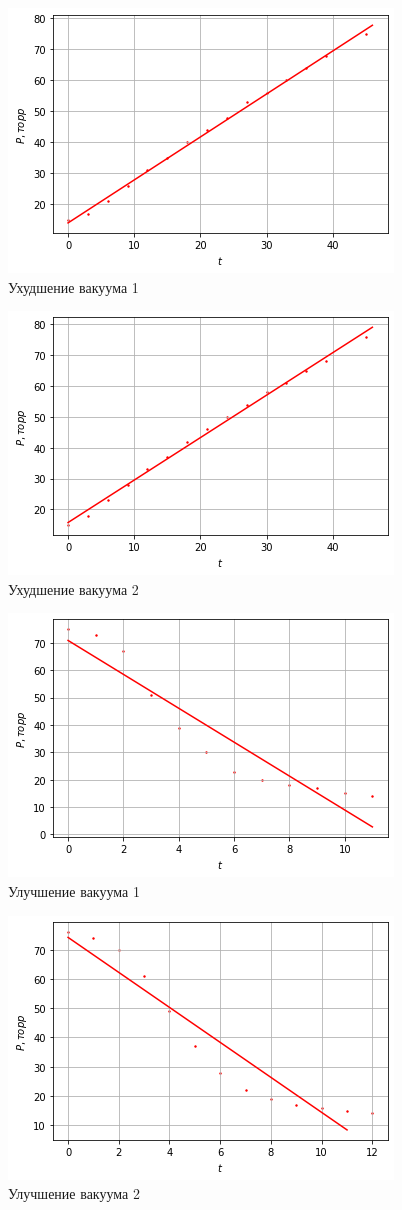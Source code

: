 \documentclass[a4paper,12pt]{article}
\begin{document}
 \begin{figure} [h!]
	\caption{Ухудшение  вакуума 1}
	\centering 
	\includegraphics[scale=0.6]{Ухудшение1.png} 
\end{figure}

\begin{figure} [h!]
	\caption{Ухудшение  вакуума 2}
	\centering 
	\includegraphics[scale=0.6]{Ухудшение2.png} 
\end{figure}

 \begin{figure} [h!]
	\caption{Улучшение вакуума 1}
	\centering 
	\includegraphics[scale=0.6]{Улучшение1.png} 
\end{figure}

\begin{figure} [h!]
	\caption{Улучшение  вакуума 2}
	\centering 
	\includegraphics[scale=0.6]{Улучшение2.png} 
\end{figure}
\end{document}
